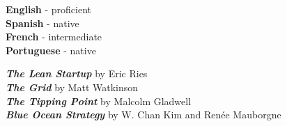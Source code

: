 \documentclass[9pt]{developercv} %
\begin{document}
%
%
\begin{minipage}[t]{0.5\textwidth}
	\vspace{-\baselineskip} %

	
	\textbf{English} - proficient\\
	\textbf{Spanish} - native\\
	\textbf{French} - intermediate\\
	\textbf{Portuguese} - native
\end{minipage}
\hfill
\begin{minipage}[t]{0.5\textwidth}
	\vspace{-\baselineskip} %
	

	\textbf{\textit{The Lean Startup}} by Eric Ries\\
	\textbf{\textit{The Grid}} by Matt Watkinson\\
	\textbf{\textit{The Tipping Point}} by Malcolm Gladwell\\
	\textbf{\textit{Blue Ocean Strategy}} by W. Chan Kim and Renée Mauborgne
\end{minipage}


%	
%	
%	

\end{document}
